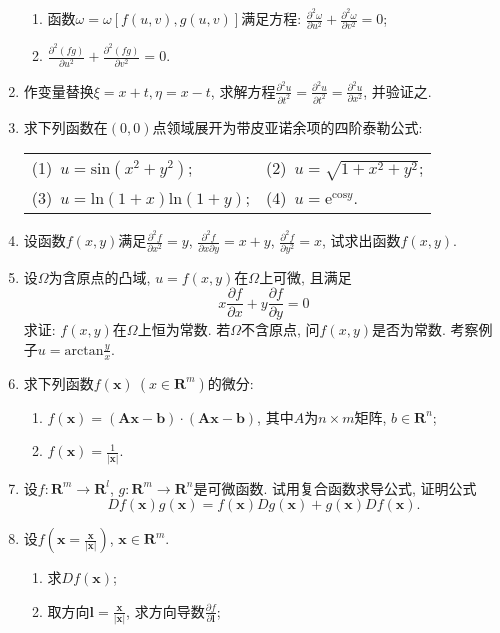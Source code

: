 \begin{enumerate}
\begin{enumerate}
	\item 函数$\omega=\omega[f(u,v),g(u,v)]$满足方程: $\frac{\partial^2\omega}{\partial u^2}+\frac{\partial^2\omega}{\partial v^2}=0$;
	\item $\frac{\partial^2(fg)}{\partial u^2}+\frac{\partial^2(fg)}{\partial v^2}=0$.
\end{enumerate}
\item 作变量替换$\xi = x+t,\eta=x-t$, 求解方程$\frac{\partial^2 u}{\partial t^2}=\frac{\partial^2 u}{\partial t^2}=\frac{\partial^2 u}{\partial x^2}$, 并验证之.
\item 求下列函数在$(0,0)$点领域展开为带皮亚诺余项的四阶泰勒公式:
\begin{table}[H]
	\begin{tabular}{ll}
		(1)\ $u=\mathrm{sin}(x^2+y^2)$;\qquad \qquad \qquad \qquad &(2)\ $u=\sqrt{1+x^2+y^2}$;\\
		(3)\ $u=\mathrm{ln}(1+x)\mathrm{ln}(1+y)$;\qquad \qquad \qquad \qquad & (4)\ $u=\mathrm{e}^{\mathrm{cos}y}$. 
	\end{tabular}
\end{table}
\item 设函数$f(x,y)$满足$\frac{\partial^2 f}{\partial x^2}=y$, $\frac{\partial^2 f}{\partial x \partial y}=x+y$, $\frac{\partial^2 f}{\partial y^2}=x$, 试求出函数$f(x,y)$.
\item 设$\Omega$为含原点的凸域, $u=f(x,y)$在$\Omega$上可微, 且满足
$$ x\frac{\partial f}{\partial x}+y\frac{\partial f}{\partial y} = 0$$
求证: $f(x,y)$在$\Omega$上恒为常数. 若$\Omega$不含原点, 问$f(x,y)$是否为常数. 考察例子$u=\mathrm{arctan}\frac{y}{x}$.
\item 求下列函数$f(\bm{x})\ (x\in \bm{R}^m)$的微分:
\begin{enumerate}
	\item $f(\bm{x})=(\bm{Ax-b})\cdot(\bm{Ax-b})$, 其中$A$为$n\times m$矩阵, $b\in \bm{R}^n$;
	\item $f(\bm{x})=\frac{1}{|\bm{x}|}$.
\end{enumerate}
\item 设$f:\bm{R}^m\rightarrow \bm{R}^l$, $g:\bm{R}^m\rightarrow \bm{R}^n$是可微函数. 试用复合函数求导公式, 证明公式
$$ Df(\bm{x})g(\bm{x}) = f(\bm{x})Dg(\bm{x}) + g(\bm{x})Df(\bm{x}).$$
\item 设$f(\bm{x}=\frac{\bm{x}}{|\bm{x}|})$, $\bm{x}\in \bm{R}^m$.
\begin{enumerate}
	\item 求$Df(\bm{x})$;
	\item 取方向$\bm{l}=\frac{\bm{x}}{|\bm{x}|}$, 求方向导数$\frac{\partial f}{\partial \bm{l}}$;

\end{enumerate}
\end{enumerate}
